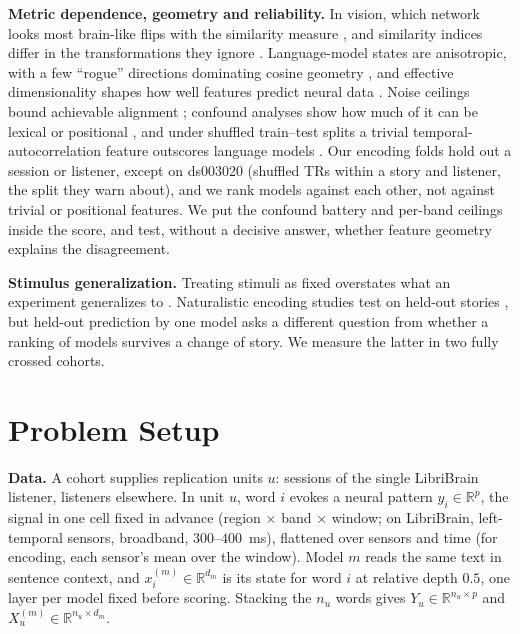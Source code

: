 \documentclass{article}
\begin{document}
\textbf{Metric dependence, geometry and reliability.} In vision, which network looks most
brain-like flips with the similarity measure \citep{soni2024conclusions, ahlert2024aligned}, and
similarity indices differ in the transformations they ignore \citep{kornblith2019similarity}.
Language-model states are anisotropic, with a few ``rogue'' directions dominating cosine geometry
\citep{ethayarajh2019contextual, timkey2021rogue}, and effective dimensionality shapes how well
features predict neural data \citep{elmoznino2024high, canatar2023spectral}. Noise ceilings bound
achievable alignment \citep{nili2014toolbox}; confound analyses show how much of it can be
lexical or positional \citep{feghhi2026spurious}, and under shuffled train--test splits a trivial temporal-autocorrelation
feature outscores language models \citep{lai2025illusions}. Our encoding folds hold out a session or
listener, except on ds003020 (shuffled TRs within a story and listener, the split they warn about),
and we rank models against each other, not against trivial or positional features. We put the confound battery and
per-band ceilings inside the score, and test, without a decisive answer, whether feature geometry
explains the disagreement.

\textbf{Stimulus generalization.} Treating stimuli as fixed overstates what an experiment
generalizes to \citep{clark1973language, westfall2016fixing, yarkoni2020generalizability}.
Naturalistic encoding studies test on held-out stories \citep{huth2016natural, lebel2023natural},
but held-out prediction by one model asks a different question from whether a ranking of models
survives a change of story. We measure the latter in two fully crossed cohorts.

\section{Problem Setup}\label{sec:setup}

\textbf{Data.} A cohort supplies replication units $u$: sessions of the single LibriBrain
listener, listeners elsewhere. In unit $u$, word $i$ evokes a neural pattern $y_i\in\mathbb{R}^p$,
the signal in one cell fixed in advance (region $\times$ band $\times$ window; on LibriBrain,
left-temporal sensors, broadband, $300$--$400$~ms), flattened over sensors and time (for encoding,
each sensor's mean over the window). Model $m$
reads the same text in sentence context, and $x^{(m)}_i\in\mathbb{R}^{d_m}$ is its state for
word $i$ at relative depth $0.5$, one layer per model fixed before scoring. Stacking the $n_u$
words gives $Y_u\in\mathbb{R}^{n_u\times p}$ and $X^{(m)}_u\in\mathbb{R}^{n_u\times d_m}$.
\end{document}
